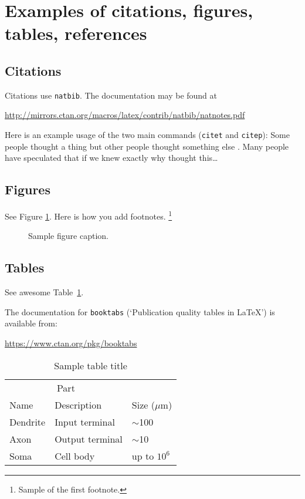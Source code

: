 \documentclass{article}
\begin{document}
	\section{Examples of citations, figures, tables, references}
	\label{sec:others}
	
	\subsection{Citations}
	Citations use \verb+natbib+. The documentation may be found at
	\begin{center}
		\url{http://mirrors.ctan.org/macros/latex/contrib/natbib/natnotes.pdf}
	\end{center}
	
	Here is an example usage of the two main commands (\verb+citet+ and \verb+citep+): Some people thought a thing \citep{kour2014real, hadash2018estimate} but other people thought something else \citep{kour2014fast}. Many people have speculated that if we knew exactly why \citet{kour2014fast} thought this\dots
	
	\subsection{Figures}
	See Figure \ref{fig:fig1}. Here is how you add footnotes. \footnote{Sample of the first footnote.}
	
	\begin{figure}
		\centering
		\fbox{\rule[-.5cm]{4cm}{4cm} \rule[-.5cm]{4cm}{0cm}}
		\caption{Sample figure caption.}
		\label{fig:fig1}
	\end{figure}
	
	\subsection{Tables}
	See awesome Table~\ref{tab:table}.
	
	The documentation for \verb+booktabs+ (`Publication quality tables in LaTeX') is available from:
	\begin{center}
		\url{https://www.ctan.org/pkg/booktabs}
	\end{center}
	
	
	\begin{table}
		\caption{Sample table title}
		\centering
		\begin{tabular}{lll}
			\toprule
			\multicolumn{2}{c}{Part}                   \\
			\cmidrule(r){1-2}
			Name     & Description     & Size ($\mu$m) \\
			\midrule
			Dendrite & Input terminal  & $\sim$100     \\
			Axon     & Output terminal & $\sim$10      \\
			Soma     & Cell body       & up to $10^6$  \\
			\bottomrule
		\end{tabular}
		\label{tab:table}
	\end{table}
	
\end{document}
